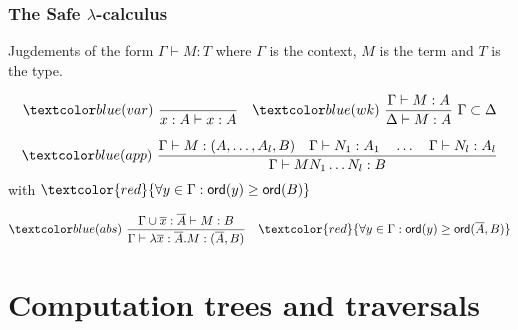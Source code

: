 

\begin{frame}[fragile]
\frametitle{The Safe $\lambda$-calculus}
Jugdements of the form $ \Gamma \vdash M : T $ where $\Gamma$ is the context, $M$ is the term and $T$ is the type.

$$ \rulename{var} \   \rulef{}{x : A\vdash x : A}
\quad  \rulename{wk} \   \rulef{\Gamma \vdash M : A}{\Delta \vdash M : A} \ \Gamma \subset \Delta$$

$$ \rulename{app} \  \rulef{\Gamma \vdash M : (A,\ldots,A_l,B)
                                        \quad \Gamma \vdash N_1 : A_1
                                        \quad \ldots \quad \Gamma \vdash N_l : A_l  }
                                   {\Gamma  \vdash M N_1 \ldots N_l : B}$$
\hfill with  $\textcolor{red}{\forall y \in \Gamma : \ord{y} \geq \ord{B}}$

$$ \rulename{abs} \   \rulef{\Gamma \union \overline{x} : \overline{A} \vdash M : B}
                                   {\Gamma  \vdash \lambda \overline{x} : \overline{A} . M : (\overline{A},B)} \quad
                                   \textcolor{red}{\forall y \in \Gamma : \ord{y} \geq \ord{\overline{A},B}}$$

\end{frame}






\section{Computation trees and traversals}

